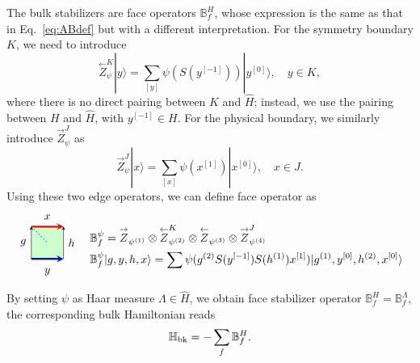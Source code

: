 \documentclass[a4paper,11pt]{article}
\theoremstyle{theorem}
\theoremstyle{remark}
\newcommand{\Bf}{\mathbb{B}}
\newcommand{\Hbb}{\mathbb{H}}
\newcommand{\ZR}{\overset{\rightarrow}{Z}}
\newcommand{\ZL}{\overset{\leftarrow}{Z}}
\newcommand{\cone}{(1)}
\newcommand{\ctwo}{(2)}
\newcommand{\cthree}{(3)}
\newcommand{\cfour}{(4)}
\begin{document}
The bulk stabilizers are face operators \( \Bf_f^{H} \), whose expression is the same as that in Eq.~\eqref{eq:ABdef} but with a different interpretation. For the symmetry boundary \( K \), we need to introduce
\[
\ZL^K_{\psi} | y \rangle = \sum_{[y]} \psi(S(y^{[-1]})) |y^{[0]}\rangle , \quad y\in K,
\]
where there is no direct pairing between \( K \) and \( \hat{H} \); instead, we use the pairing between \( H \) and \( \hat{H} \), with \( y^{[-1]} \in H \).
For the physical boundary, we similarly introduce \( \ZR^J_{\psi} \) as
\[
\ZR^J_{\psi} | x \rangle = \sum_{[x]} \psi(x^{[1]}) | x^{[0]} \rangle, \quad x\in J.
\]
Using these two edge operators, we can define face operator as 
\begin{equation}
\begin{aligned}
    \begin{tikzpicture}
    \begin{scope}[rotate=-90] %
        \fill[green!20] (0, 0) rectangle (1,1); %
        \draw[-stealth,red,line width = 1.6pt] (0,0) -- (0,1);
       \draw[cyan,dotted, line width = 1pt] (0,0) -- (0.5,0.5); 
        \draw[-stealth,blue,line width = 1.6pt] (1,0) -- (1,1);
        \draw[-stealth,black] (1,1) -- (0,1); 
                \draw[-stealth,black] (1,0) -- (0,0); 
        \node[ line width=0.2pt, dashed, draw opacity=0.5] (a) at (-0.3,0.5){$x$};
        \node[ line width=0.2pt, dashed, draw opacity=0.5] (a) at (1.4,0.5){$y$};
        \node[ line width=0.2pt, dashed, draw opacity=0.5] (a) at (0.5,1.25){$h$};
            \node[ line width=0.2pt, dashed, draw opacity=0.5] (a) at (0.5,-.25){$g$};
    \end{scope}
\end{tikzpicture}   
\end{aligned}
\quad
\begin{aligned}
   & \Bf_f^{\psi}=\ZR_{\psi^{\cone}}\otimes \ZL^K_{\psi^{\ctwo}} \otimes \ZL_{\psi^{\cthree}} \otimes \ZR_{\psi^{\cfour}}^J\\
   &   \Bf_f^{\psi} |g,y,h,x\rangle= \sum \psi(g^{\ctwo} S(y^{[-1]}) S(h^{(1)}) x^{[1]}) |g^{\cone},y^{[0]},h^{\ctwo},x^{[0]}\rangle
\end{aligned}
\end{equation}
By setting $\psi$ as Haar measure $\Lambda\in \hat{H}$, we obtain face stabilizer operator $\Bf_f^H=\Bf_f^{\Lambda}$, the corresponding bulk Hamiltonian reads
\begin{equation}
    \Hbb_{\rm bk} =-\sum_f \Bf_f^{H}.
\end{equation}
\end{document}
